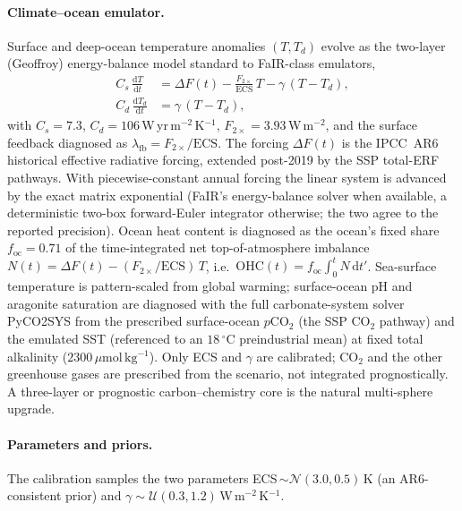 \documentclass[10pt]{article}
\begin{document}
\paragraph*{Climate--ocean emulator.}
Surface and deep-ocean temperature anomalies $(T,T_d)$ evolve as the two-layer
(Geoffroy) energy-balance model\citep{Geoffroy2013} standard to FaIR-class
emulators\citep{Leach2021},
\begin{align}
C_s\,\frac{\mathrm{d}T}{\mathrm{d}t} &= \Delta F(t) - \frac{F_{2\times}}{\mathrm{ECS}}\,T - \gamma\,(T-T_d),\\
C_d\,\frac{\mathrm{d}T_d}{\mathrm{d}t} &= \gamma\,(T-T_d),
\end{align}
with $C_s=7.3$, $C_d=106$\,W\,yr\,m$^{-2}$\,K$^{-1}$, $F_{2\times}=3.93$\,W\,m$^{-2}$,
and the surface feedback diagnosed as $\lambda_{\mathrm{fb}}=F_{2\times}/\mathrm{ECS}$.
The forcing $\Delta F(t)$ is the IPCC~AR6 historical effective radiative
forcing\citep{Forster2021}, extended post-2019 by the SSP total-ERF
pathways\citep{Meinshausen2020, oneill2017roads}. With piecewise-constant annual
forcing the linear system is advanced by the exact matrix exponential (FaIR's
energy-balance solver when available, a deterministic two-box forward-Euler
integrator otherwise; the two agree to the reported precision). Ocean heat content
is diagnosed as the ocean's fixed share $f_{\mathrm{oc}}=0.71$ of the
time-integrated net top-of-atmosphere imbalance
$N(t)=\Delta F(t)-(F_{2\times}/\mathrm{ECS})\,T$, i.e.\
$\mathrm{OHC}(t)=f_{\mathrm{oc}}\!\int_0^t N\,\mathrm{d}t'$. Sea-surface temperature
is pattern-scaled from global warming; surface-ocean pH and aragonite saturation
are diagnosed with the full carbonate-system solver PyCO2SYS\citep{Humphreys2022}
from the prescribed surface-ocean $p\mathrm{CO}_2$ (the SSP CO$_2$ pathway) and the
emulated SST (referenced to an $18\,^{\circ}$C preindustrial mean) at fixed total
alkalinity ($2300\,\mu\mathrm{mol\,kg^{-1}}$). Only ECS and $\gamma$ are
calibrated; CO$_2$ and the other greenhouse gases are prescribed from the
scenario, not integrated prognostically. A three-layer or prognostic
carbon--chemistry core\citep{Cummins2020} is the natural multi-sphere upgrade.

\paragraph*{Parameters and priors.}
The calibration samples the two parameters ECS\,$\sim\mathcal{N}(3.0,0.5)$\,K (an
AR6-consistent prior\citep{Sherwood2020}) and
$\gamma\sim\mathcal{U}(0.3,1.2)$\,W\,m$^{-2}$\,K$^{-1}$.
\end{document}
